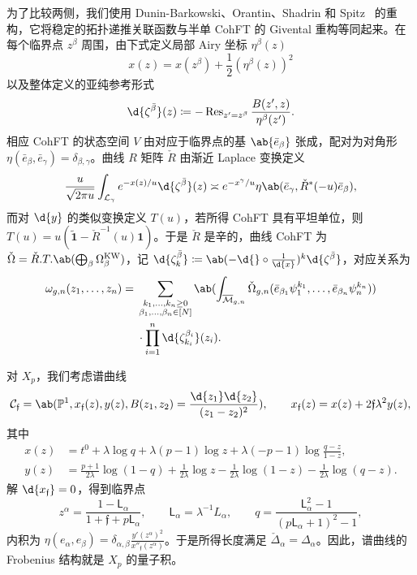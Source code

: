 \documentclass{amsart}
\theoremstyle{definition}
\theoremstyle{remark}
\theoremstyle{plain}
\theoremstyle{definition}
\theoremstyle{remark}
\renewcommand{\P}{\mathbb{P}}
\newcommand{\Mbar}{\overline{\mathcal{M}}}
\newcommand{\mc}[1]{\mathcal{#1}}
\newcommand{\mf}[1]{\mathfrak{#1}}
\newcommand{\mr}[1]{\mathrm{#1}}
\newcommand{\on}[1]{\operatorname{#1}}
\newcommand{\ms}[1]{\mathsf{#1}}
\newcommand{\wt}[1]{\widetilde{#1}}
\newcommand{\1}{\mathbf{1}}
\newcommand{\2}{\mathbf{2}}
\newcommand{\3}{\mathbf{3}}
\begin{document}
为了比较两侧，我们使用 Dunin-Barkowski、Orantin、Shadrin 和 Spitz~\cite{DOSS2014} 的重构，它将稳定的拓扑递推关联函数与半单 CohFT 的 Givental 重构等同起来。在每个临界点 \(z^{\beta}\) 周围，由下式定义局部 Airy 坐标 \(\eta^{\beta}(z)\)
\[ x(z) = x(z^{\beta}) + \frac{1}{2}(\eta^{\beta}(z))^2 \]
以及整体定义的亚纯参考形式
\[ \d{\zeta^{\bar{\beta}}}(z) \coloneqq -\on{Res}_{z'=z^{\beta}}\frac{B(z',z)}{\eta^{\beta}(z')}. \]
相应 CohFT 的状态空间 \(V\) 由对应于临界点的基 \(\ab\{\bar{e}_{\beta}\}\) 张成，配对为对角形 \(\eta(\bar{e}_{\beta},\bar{e}_{\gamma}) = \delta_{\beta,\gamma}\)。曲线 \(R\) 矩阵 \(\check{R}\) 由渐近 Laplace 变换定义
\[ \frac{u}{\sqrt{2\pi u}}\int_{\mc{L}_{\gamma}} e^{-x(z)/u}\d{\zeta^{\bar{\beta}}}(z) \asymp e^{-x^{\gamma}/u}\eta\ab(\bar{e}_{\gamma}, \check{R}^*(-u)\bar{e}_{\beta}), \]
而对 \(\d{y}\) 的类似变换定义 \(T(u)\)，若所得 CohFT 具有平坦单位，则 \(T(u) = u(\wt{\1}-\check{R}^{-1}(u)\1)\)。于是 \(\check{R}\) 是辛的，曲线 CohFT 为 \(\check{\Omega} = \check{R}.T.\ab(\bigoplus_{\beta}\Omega^{\mr{KW}}_{\beta})\)，记 \(\d{\zeta^{\bar{\beta}}_k} \coloneqq \ab(-\d{} \circ \frac{1}{\d{x}})^k \d{\zeta^{\bar{\beta}}}\)，对应关系为
\begin{align*}
    \omega_{g,n}(z_1,\ldots,z_n) ={}& \sum_{\substack{k_1,\ldots,k_n \geq 0 \\ \beta_1,\ldots,\beta_n \in [N]}}\ab(\int_{\Mbar_{g,n}} \check{\Omega}_{g,n}(\bar{e}_{\beta_1}\psi_1^{k_1},\ldots,\bar{e}_{\beta_n}\psi_n^{k_n})) \\
    &\cdot \prod_{i=1}^n \d{\zeta^{\beta_i}_{k_i}}(z_i).
\end{align*}

对 \(X_p\)，我们考虑谱曲线
\[ \mc{C}_{\mf{f}} = \ab(\P^1, x_{\mf{f}}(z), y(z), B(z_1,z_2) = \frac{\d{z_1}\d{z_2}}{(z_1-z_2)^2}), \qquad x_{\mf{f}}(z) = x(z) + 2\mf{f}\lambda^2 y(z), \]
其中
\begin{align*}
    x(z) &= t^0 + \lambda \log q + \lambda(p-1)\log z + \lambda(-p-1)\log\frac{q-z}{1-z}, \\
    y(z) &= \frac{p+1}{2\lambda}\log(1-q) + \frac{1}{2\lambda}\log z - \frac{1}{2\lambda}\log(1-z) - \frac{1}{2\lambda}\log(q-z).
\end{align*}
解 \(\d{x_{\mf{f}}} = 0\)，得到临界点
\[ z^{\alpha} = \frac{1-\ms{L}_{\alpha}}{1+\mf{f}+p\ms{L}_{\alpha}}, \qquad \ms{L}_{\alpha} = \lambda^{-1}L_{\alpha}, \qquad q = \frac{\ms{L}_{\alpha}^2-1}{(p\ms{L}_{\alpha}+1)^2-1}, \]
内积为 \(\eta(e_{\alpha},e_{\beta}) = \delta_{\alpha,\beta}\frac{y'(z^{\alpha})^2}{x''_{\mf{f}}(z^{\alpha})}\)。于是所得长度满足 \(\check{\Delta}_{\alpha} = \Delta_{\alpha}\)。因此，谱曲线的 Frobenius 结构就是 \(X_p\) 的量子积。
\end{document}
